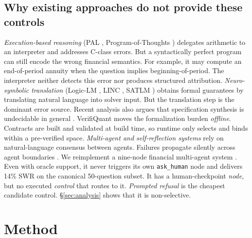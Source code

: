\subsection{Why existing approaches do not provide these controls}
\emph{Execution-based reasoning} (PAL \cite{gao2023pal}, Program-of-Thoughts \cite{chen2023pot}) delegates arithmetic to an interpreter and addresses C-class errors.
But a syntactically perfect program can still encode the wrong financial semantics.
For example, it may compute an end-of-period annuity when the question implies beginning-of-period.
The interpreter neither detects this error nor produces structured attribution.
\emph{Neuro-symbolic translation} (Logic-LM \cite{pan2023logiclm}, LINC \cite{olausson2023linc}, SATLM \cite{ye2023satlm}) obtains formal guarantees by translating natural language into solver input.
But the translation step is the dominant error source.
Recent analysis also argues that specification synthesis is undecidable in general \cite{zhou2026formaljudge}.
VerifiQuant moves the formalization burden \emph{offline}.
Contracts are built and validated at build time, so runtime only selects and binds within a pre-verified space.
\emph{Multi-agent and self-reflection systems} rely on natural-language consensus between agents.
Failures propagate silently across agent boundaries \cite{cemri2025mas}.
We reimplement a nine-node financial multi-agent system \cite{kundu2025multiagent}.
Even with oracle support, it never triggers its own \texttt{ask\_human} node and delivers 14\% SWR on the canonical 50-question subset.
It has a human-checkpoint \emph{node}, but no executed \emph{control} that routes to it.
\emph{Prompted refusal} is the cheapest candidate control.
\S\ref{sec:analysis} shows that it is non-selective.

\section{Method}\label{sec:method}

